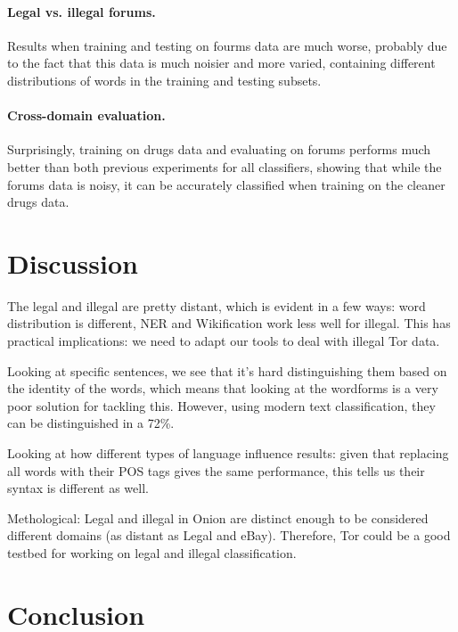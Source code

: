 \documentclass[11pt,a4paper,table]{article}
\begin{document}
\paragraph{Legal vs. illegal forums.}

Results when training and testing on fourms data are much worse,
probably due to the fact that this data is much noisier and more varied,
containing different distributions of words in the training and testing
subsets.

\paragraph{Cross-domain evaluation.}

Surprisingly, training on drugs data and evaluating on forums performs much
better than both previous experiments for all classifiers,
showing that while the forums data is noisy, it can be accurately classified
when training on the cleaner drugs data.


\section{Discussion}

The legal and illegal are pretty distant, which is evident in a few ways: word distribution is different, NER and Wikification work less well
for illegal. This has practical implications: we need to adapt our tools to deal with illegal Tor data. 

Looking at specific sentences, we see that it's hard distinguishing them based on the identity of the words, which means that
looking at the wordforms is a very poor solution for tackling this. However, using modern text classification, they can be distinguished
in a 72\%. 

Looking at how different types of language influence results: given that replacing all words with their POS tags gives
the same performance, this tells us their syntax is different as well.

Methological: Legal and illegal in Onion are distinct enough to be considered different domains (as distant as Legal and eBay). 
Therefore, Tor could be a good testbed for working on legal and illegal classification.


\section{Conclusion}
 














\end{document}
